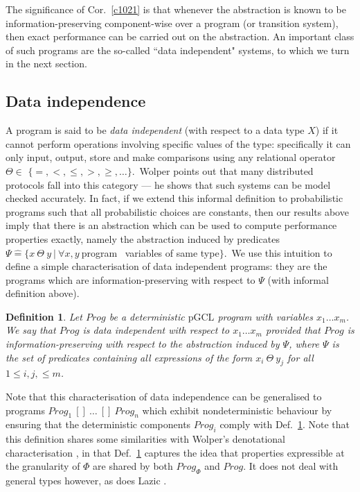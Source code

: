 \documentclass[numbers,copyright,creativecommons]{eptcs}
\newcommand{\Ch}{\ [\!] \ }
\newcommand{\pGCL}{\mbox{pGCL}}
\newcommand{\Prog}{\textit{Prog}}
\newcommand{\Defs}{\mathrel{\hat{=}}}
\newcommand{\Cor}[1]{Cor.~\ref{#1}}
\newtheorem{Defns}{Definition}\newtheorem{Corl}{Corollary}\newcommand{\Def}[1]{Def.~\ref{#1}}
\begin{document}
The significance of \Cor{c1021} is that whenever the abstraction is known to be information-preserving component-wise over a program (or transition system), then exact performance can be carried out on the abstraction. An important class of such programs are the so-called ``data independent" systems, to which we turn in the next section.

\subsection{Data independence}

A program is said to be \emph{data independent} (with respect to a data type $X$) \cite{Wolper86} if it cannot perform operations involving specific values of  the type: specifically it can only input, output, store and make comparisons using any relational operator $\Theta \in$ $\{=, <, \le, >, \ge, \dots\}$.\ Wolper points out that many distributed protocols fall into this category --- he shows that such systems can be model checked accurately.  In fact, if we extend this informal definition to probabilistic programs such that all probabilistic choices are constants, then our results above imply that there is an abstraction which can be used to compute performance properties exactly, namely the abstraction induced by predicates $\Psi \Defs \{x \ \Theta \ y \ | \ \forall x,y \ $program \ variables of same type$ \}$.\ We use this intuition to define a simple characterisation of data independent programs: they are the programs which are information-preserving with respect to  $\Psi$ (with informal definition above).

 \begin{Defns}\label{d1100}
 Let $\Prog$ be a deterministic $\pGCL$ program with variables $x_1 \dots x_m$. We say that $\Prog$ is \emph{data independent} with respect to $x_1 \dots x_m$ provided that $\Prog$ is information-preserving with respect to the abstraction induced by $\Psi$, where $\Psi$ is the set of predicates containing all expressions of the form $x_{i} \ \Theta \ y_{j}$ for all $1\leq i, j, \leq m$.
 \end{Defns}

\noindent Note that this characterisation of data independence can be generalised to programs $\mathord{\Prog_1 \Ch \dots \Ch \Prog_n}$ which exhibit nondeterministic behaviour by ensuring that the deterministic components $\Prog_i$ comply with \Def{d1100}. Note that this definition shares some similarities with Wolper's denotational characterisation \cite{Wolper86}, in that \Def{d1100} captures the idea that properties expressible at the granularity of $\Phi$ are shared by both $\Prog_\Phi$ and $\Prog$.  It does not deal with general types however, as does Lazic \cite{Lazic99}.
\end{document}

